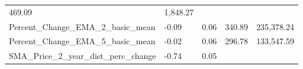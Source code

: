 \documentclass[]{article}
\begin{document}
\begin{longtable}[]{@{}lllll@{}}
\begin{minipage}[t]{0.09\columnwidth}
469.09\strut
\end{minipage} & \begin{minipage}[t]{0.11\columnwidth}\raggedright\strut
1,848.27\strut
\end{minipage}\tabularnewline
\begin{minipage}[t]{0.49\columnwidth}\raggedright\strut
Percent\_Change\_EMA\_2\_basic\_mean\strut
\end{minipage} & \begin{minipage}[t]{0.08\columnwidth}\raggedright\strut
-0.09\strut
\end{minipage} & \begin{minipage}[t]{0.09\columnwidth}\raggedright\strut
0.06\strut
\end{minipage} & \begin{minipage}[t]{0.09\columnwidth}\raggedright\strut
340.89\strut
\end{minipage} & \begin{minipage}[t]{0.11\columnwidth}\raggedright\strut
235,378.24\strut
\end{minipage}\tabularnewline
\begin{minipage}[t]{0.49\columnwidth}\raggedright\strut
Percent\_Change\_EMA\_5\_basic\_mean\strut
\end{minipage} & \begin{minipage}[t]{0.08\columnwidth}\raggedright\strut
-0.02\strut
\end{minipage} & \begin{minipage}[t]{0.09\columnwidth}\raggedright\strut
0.06\strut
\end{minipage} & \begin{minipage}[t]{0.09\columnwidth}\raggedright\strut
296.78\strut
\end{minipage} & \begin{minipage}[t]{0.11\columnwidth}\raggedright\strut
133,547.59\strut
\end{minipage}\tabularnewline
\begin{minipage}[t]{0.49\columnwidth}\raggedright\strut
SMA\_Price\_2\_year\_dist\_perc\_change\strut
\end{minipage} & \begin{minipage}[t]{0.08\columnwidth}\raggedright\strut
-0.74\strut
\end{minipage} & \begin{minipage}[t]{0.09\columnwidth}\raggedright\strut
0.05\strut
\end{minipage} & \begin{minipage}[t]{0.09\columnwidth}\raggedright\strut

\end{minipage}
\end{longtable}
\end{document}
